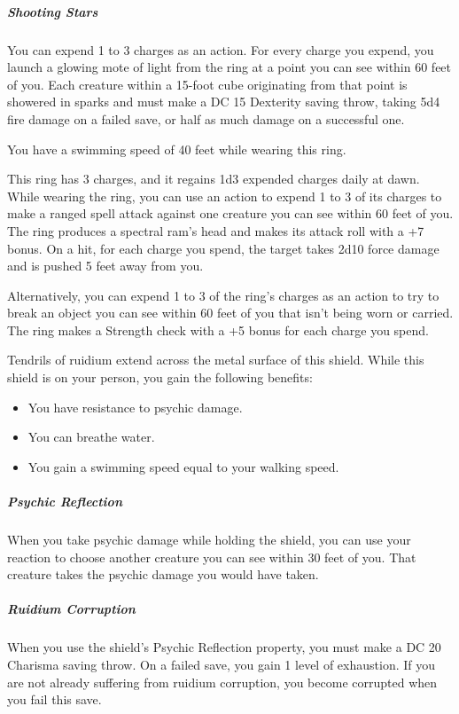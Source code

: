 \documentclass[10pt,a4paper,twoside,fancy,bg=print,twocolumn,openany,nodeprecatedcode]{dndbook}
\begin{document}
\subparagraph{Shooting Stars}
You can expend 1 to 3 charges as an action. For every charge you expend, you launch a glowing mote of light from the ring at a point you can see within 60 feet of you. Each creature within a 15-foot cube originating from that point is showered in sparks and must make a DC 15 Dexterity saving throw, taking 5d4 fire damage on a failed save, or half as much damage on a successful one.

You have a swimming speed of 40 feet while wearing this ring.

This ring has 3 charges, and it regains 1d3 expended charges daily at dawn. While wearing the ring, you can use an action to expend 1 to 3 of its charges to make a ranged spell attack against one creature you can see within 60 feet of you. The ring produces a spectral ram's head and makes its attack roll with a +7 bonus. On a hit, for each charge you spend, the target takes 2d10 force damage and is pushed 5 feet away from you.

Alternatively, you can expend 1 to 3 of the ring's charges as an action to try to break an object you can see within 60 feet of you that isn't being worn or carried. The ring makes a Strength check with a +5 bonus for each charge you spend.

Tendrils of ruidium extend across the metal surface of this shield. While this shield is on your person, you gain the following benefits:


\begin{itemize}
\item You have resistance to psychic damage.
\item You can breathe water.
\item You gain a swimming speed equal to your walking speed.
\end{itemize}

\subparagraph{Psychic Reflection}
When you take psychic damage while holding the shield, you can use your reaction to choose another creature you can see within 30 feet of you. That creature takes the psychic damage you would have taken.

\subparagraph{Ruidium Corruption}
When you use the shield's Psychic Reflection property, you must make a DC 20 Charisma saving throw. On a failed save, you gain 1 level of exhaustion. If you are not already suffering from ruidium corruption, you become corrupted when you fail this save.
\end{document}
